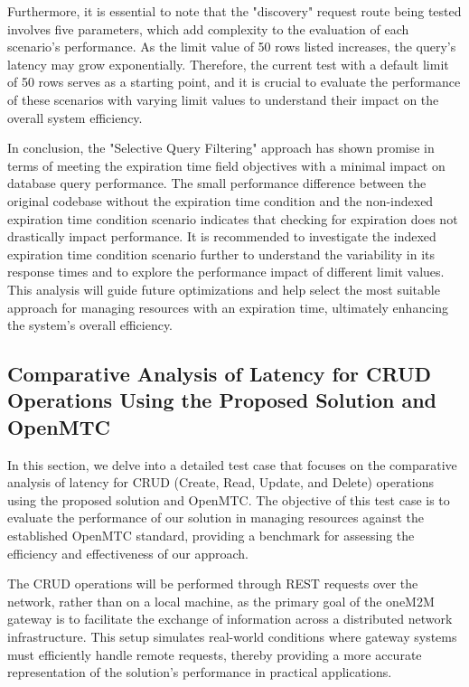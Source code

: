 \documentclass[a4paper,fleqn]{cas-dc}
\begin{document}
Furthermore, it is essential to note that the "discovery" request route being tested involves five parameters, which add complexity to the evaluation of each scenario's performance. As the limit value of 50 rows listed increases, the query's latency may grow exponentially. Therefore, the current test with a default limit of 50 rows serves as a starting point, and it is crucial to evaluate the performance of these scenarios with varying limit values to understand their impact on the overall system efficiency.

In conclusion, the "Selective Query Filtering" approach has shown promise in terms of meeting the expiration time field objectives with a minimal impact on database query performance. The small performance difference between the original codebase without the expiration time condition and the non-indexed expiration time condition scenario indicates that checking for expiration does not drastically impact performance. It is recommended to investigate the indexed expiration time condition scenario further to understand the variability in its response times and to explore the performance impact of different limit values. This analysis will guide future optimizations and help select the most suitable approach for managing resources with an expiration time, ultimately enhancing the system's overall efficiency.

\subsection{Comparative Analysis of Latency for CRUD Operations Using the Proposed Solution and OpenMTC}

In this section, we delve into a detailed test case that focuses on the comparative analysis of latency for CRUD (Create, Read, Update, and Delete) operations using the proposed solution and OpenMTC. The objective of this test case is to evaluate the performance of our solution in managing resources against the established OpenMTC standard, providing a benchmark for assessing the efficiency and effectiveness of our approach.

The CRUD operations will be performed through REST requests over the network, rather than on a local machine, as the primary goal of the oneM2M gateway is to facilitate the exchange of information across a distributed network infrastructure. This setup simulates real-world conditions where gateway systems must efficiently handle remote requests, thereby providing a more accurate representation of the solution's performance in practical applications.
\end{document}
